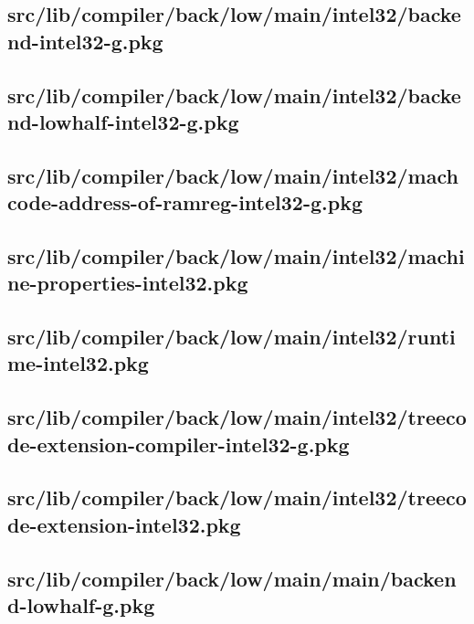 \subsection{src/lib/compiler/back/low/main/intel32/backend-intel32-g.pkg}


\subsection{src/lib/compiler/back/low/main/intel32/backend-lowhalf-intel32-g.pkg}


\subsection{src/lib/compiler/back/low/main/intel32/machcode-address-of-ramreg-intel32-g.pkg}


\subsection{src/lib/compiler/back/low/main/intel32/machine-properties-intel32.pkg}


\subsection{src/lib/compiler/back/low/main/intel32/runtime-intel32.pkg}


\subsection{src/lib/compiler/back/low/main/intel32/treecode-extension-compiler-intel32-g.pkg}


\subsection{src/lib/compiler/back/low/main/intel32/treecode-extension-intel32.pkg}


\subsection{src/lib/compiler/back/low/main/main/backend-lowhalf-g.pkg}



